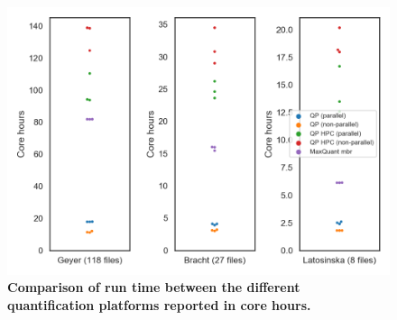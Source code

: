 \documentclass[11pt]{article}
\begin{document}
\begin{figure}[H]
  \includegraphics[width=\linewidth]{data/cores.png}
  \caption{\textbf{Comparison of run time between the different quantification platforms reported in core hours.}}
  \label{fig:corehours}
\end{figure}
\end{document}
